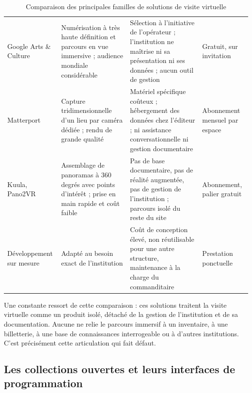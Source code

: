 \begin{table}[htbp]
\centering
\caption{Comparaison des principales familles de solutions de visite virtuelle}
\label{tab:comparvv}
\small
\begin{tabularx}{\textwidth}{|L{3.1cm}|X|L{3.0cm}|L{2.6cm}|}
\hline
{}
 &  &  &  \\ \hline
Google Arts \& Culture &
Numérisation à très haute définition et parcours en vue immersive ; audience
mondiale considérable &
Sélection à l'initiative de l'opérateur ; l'institution ne maîtrise ni sa
présentation ni ses données ; aucun outil de gestion &
Gratuit, sur invitation \\ \hline
Matterport &
Capture tridimensionnelle d'un lieu par caméra dédiée ; rendu de grande qualité &
Matériel spécifique coûteux ; hébergement des données chez l'éditeur ; ni
assistance conversationnelle ni gestion documentaire &
Abonnement mensuel par espace \\ \hline
Kuula, Pano2VR &
Assemblage de panoramas à 360 degrés avec points d'intérêt ; prise en main
rapide et coût faible &
Pas de base documentaire, pas de réalité augmentée, pas de gestion de
l'institution ; parcours isolé du reste du site &
Abonnement, palier gratuit \\ \hline
Développement sur mesure &
Adapté au besoin exact de l'institution &
Coût de conception élevé, non réutilisable pour une autre structure, maintenance
à la charge du commanditaire &
Prestation ponctuelle \\ \hline
\end{tabularx}
\end{table}

Une constante ressort de cette comparaison : ces solutions traitent la visite
virtuelle comme un produit isolé, détaché de la gestion de l'institution et de
sa documentation. Aucune ne relie le parcours immersif à un inventaire, à une
billetterie, à une base de connaissances interrogeable ou à d'autres
institutions. C'est précisément cette articulation qui fait défaut.

\subsection{Les collections ouvertes et leurs interfaces de programmation}

